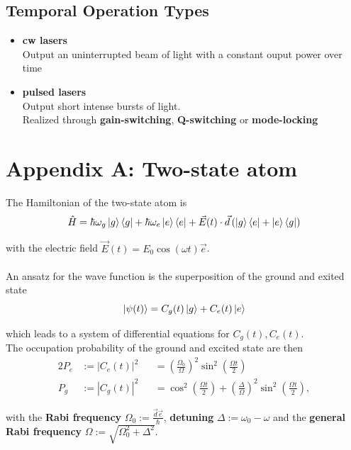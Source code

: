 \documentclass{article}
\newcommand{\lr}[1]{\left(#1\right)}
\begin{document}
\subsection{Temporal Operation Types}
	\begin{itemize}
		\item \textbf{cw lasers}\\
		Output an uninterrupted beam of light with a constant ouput power over time
		
		
		\item \textbf{pulsed lasers}\\
		Output short intense bursts of light.\\
		Realized through \textbf{gain-switching}, \textbf{Q-switching} or \textbf{mode-locking}
	\end{itemize}


\newpage


\section*{Appendix A: Two-state atom}
The Hamiltonian of the two-state atom is
	\begin{equation}
		\hat{H} = \hbar\omega_g \ket{g}\bra{g} + \hbar\omega_e \ket{e}\bra{e} + \vec{E}(t) \cdot \vec{d} \lr{ \ket{g}\bra{e} + \ket{e}\bra{g} }
	\end{equation}
	
with the electric field $\vec{E}(t) = E_0 \cos(\omega t) \vec{e}$.\\
\\
An ansatz for the wave function is the superposition of the ground and exited state
	\begin{equation}
		\ket{\psi(t)} = C_g(t) \ket{g} + C_e(t) \ket{e}
	\end{equation}

which leads to a system of differential equations for $C_g(t), C_e(t)$.\\
The occupation probability of the ground and excited state are then
	\begin{alignat}{2}
		P_e &:= |C_e(t)|^2 &&= \lr{ \frac{\Omega_0}{\Omega} }^2 \sin^2\lr{ \frac{\Omega t}{2} } \\
		P_g &:= |C_g(t)|^2 &&= \cos^2\lr{ \frac{\Omega t}{2} } + \lr{ \frac{\Delta}{\Omega} }^2 \sin^2\lr{ \frac{\Omega t}{2} },
	\end{alignat}

with the \textbf{Rabi frequency} $\Omega_0 := \frac{\vec{d}\vec{e}}{\hbar}$, \textbf{detuning} $\Delta := \omega_0 - \omega$ and the \textbf{general Rabi frequency} $\Omega := \sqrt{ \Omega_0^2 + \Delta^2 }$.
\end{document}
